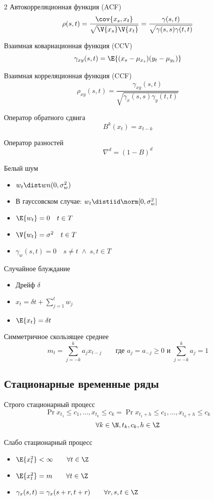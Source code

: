 \documentclass[landscape]{article}
\begin{document}
\begin{multicols*}{2}
Автокорреляционная функция (ACF)
\[\rho(s,t) = \frac{\cov{x_s,x_t}}{\sqrt{\V{x_s}\V{x_t}}}
            = \frac{\gamma(s,t)}{\sqrt{\gamma(s,s)\gamma(t,t)}}\]

Взаимная ковариационная функция (CCV)
\[\gamma_{xy}(s,t) = \E{(x_s-\mu_{x_s})(y_t-\mu_{y_t})}\]

Взаимная корреляционная функция (CCF)
\[\rho_{xy}(s,t) = \frac{\gamma_{xy}(s,t)}{\sqrt{\gamma_x(s,s)\gamma_y(t,t)}}\]

Оператор обратного сдвига
\[B^k(x_t) = x_{t-k}\]

Оператор разностей
\[\nabla^d = (1-B)^d\]

Белый шум
\begin{itemize}
  \item $w_t \dist wn(0, \sigma_w^2)$
  \item В гауссовском случае: $w_t \distiid \norm[0, \sigma_w^2]$
  \item $\E{w_t} = 0 \quad t\in T$
  \item $\V{w_t} = \sigma^2 \quad t\in T$
  \item $\gamma_w(s,t) = 0 \quad s \neq t \;\wedge\; s,t\in T$
\end{itemize}


Случайное блуждание
\begin{itemize}
  \item Дрейф $\delta$
  \item $x_t = \delta t + \sum_{j=1}^t w_j$
  \item $\E{x_t} = \delta t$
\end{itemize}

Симметричное скользящее среднее
\[m_t = \sum_{j=-k}^k a_j x_{t-j}
\qquad \text{где } a_j=a_{-j}\ge0 \text{ и } \sum_{j=-k}^k a_j = 1\]

\subsection{Стационарные временные ряды}

Строго стационарный процесс
\[\Pr{x_{t_1} \le c_1, \dots, x_{t_k} \le c_k} =
  \Pr{x_{t_1+h} \le c_1, \dots, x_{t_k+h} \le c_k}\]
\[\forall k\in\N,t_k, c_k, h\in\Z\]

Слабо стационарный процесс
\begin{itemize}
  \item $\E{x_t^2} < \infty \qquad\forall t\in\Z$
  \item $\E{x_t^2} = m \qquad\forall t\in\Z$
  \item $\gamma_x(s,t) = \gamma_x(s+r, t+r) \qquad\forall r,s,t\in\Z$
\end{itemize}


\end{multicols*}
\end{document}
